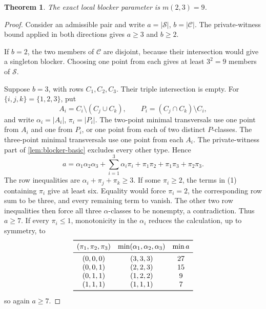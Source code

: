 \documentclass[a4paper,fleqn,longmktitle]{cas-sc}
\newtheorem{theorem}{Theorem}[section]
\theoremstyle{definition}
\theoremstyle{remark}
\begin{document}
\begin{theorem}
\label{thm:m23}
The exact local blocker parameter is $m(2,3)=9$.
\end{theorem}

\begin{proof}
Consider an admissible pair and write
$a=|\mathcal S|$, $b=|\mathcal C|$.  The private-witness bound applied in both
directions gives $a\geq3$ and $b\geq2$.

If $b=2$, the two members of $\mathcal C$ are disjoint, because their
intersection would give a singleton blocker.  Choosing one point from each
gives at least $3^2=9$ members of $\mathcal S$.

Suppose $b=3$, with rows $C_1,C_2,C_3$.  Their triple intersection is empty.
For $\{i,j,k\}=\{1,2,3\}$, put
\[
  A_i=C_i\setminus(C_j\cup C_k),\qquad
  P_i=(C_j\cap C_k)\setminus C_i,
\]
and write $\alpha_i=|A_i|$, $\pi_i=|P_i|$.  The two-point minimal
transversals use one point from $A_i$ and one from $P_i$, or one point from
each of two distinct $P$-classes.  The three-point minimal transversals use
one point from each $A_i$.  The private-witness part of
\cref{lem:blocker-basic} excludes every other type.  Hence
\[
  a=\alpha_1\alpha_2\alpha_3+
  \sum_{i=1}^3\alpha_i\pi_i+
  \pi_1\pi_2+\pi_1\pi_3+\pi_2\pi_3.
  \tag{1}
\]
The row inequalities are
$\alpha_i+\pi_j+\pi_k\geq3$.  If some $\pi_i\geq2$, the terms in (1)
containing $\pi_i$ give at least six.  Equality would force
$\pi_i=2$, the corresponding row sum to be three, and every remaining term
to vanish.  The other two row inequalities then force all three
$\alpha$-classes to be nonempty, a contradiction.  Thus $a\geq7$.  If every
$\pi_i\leq1$, monotonicity in the $\alpha_i$ reduces the calculation, up to
symmetry, to
\[
\begin{array}{ccc}
\toprule
(\pi_1,\pi_2,\pi_3)&
\min(\alpha_1,\alpha_2,\alpha_3)&\min a\\
\midrule
(0,0,0)&(3,3,3)&27\\
(0,0,1)&(2,2,3)&15\\
(0,1,1)&(1,2,2)&9\\
(1,1,1)&(1,1,1)&7\\
\bottomrule
\end{array}
\]
so again $a\geq7$.


\end{proof}
\end{document}

